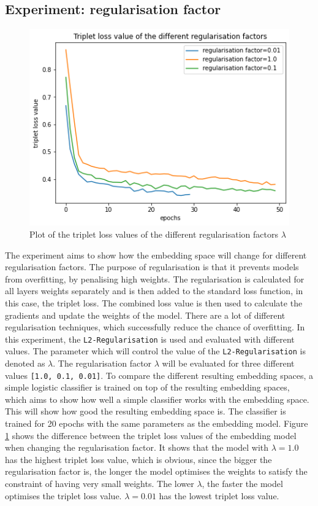 \subsection{Experiment: regularisation factor}
\label{sub:Experiment-Regularisation-Factor}
\begin{figure}[H]
\centering
    \includegraphics[width=0.5\linewidth]{study-doc/experiment_regularisation/assets/triplet_loss.png}
    \caption{Plot of the triplet loss values of the different regularisation factors $\lambda$}
    \label{fig:plot-triplet-loss}
\end{figure}
\noindent
The experiment aims to show how the embedding space will change for different regularisation factors. The purpose of regularisation is that it prevents models from overfitting, by penalising high weights. The regularisation is calculated for all layers weights separately and is then added to the standard loss function, in this case, the triplet loss. The combined loss value is then used to calculate the gradients and update the weights of the model. There are a lot of different regularisation techniques, which successfully reduce the chance of overfitting. In this experiment, the \texttt{L2-Regularisation} is used and evaluated with different values. The parameter which will control the value of the \texttt{L2-Regularisation} is denoted as $\lambda$. The regularisation factor $\lambda$ will be evaluated for three different values \texttt{[1.0, 0.1, 0.01]}.
\newline
\newline
To compare the different resulting embedding spaces, a simple logistic classifier is trained on top of the resulting embedding spaces, which aims to show how well a simple classifier works with the embedding space. This will show how good the resulting embedding space is. The classifier is trained for 20 epochs with the same parameters as the embedding model.
\newline
\newline
Figure \ref{fig:plot-triplet-loss} shows the difference between the triplet loss values of the embedding model when changing the regularisation factor. It shows that the model with $\lambda = 1.0$ has the highest triplet loss value, which is obvious, since the bigger the regularisation factor is, the longer the model optimises the weights to satisfy the constraint of having very small weights. The lower $\lambda$, the faster the model optimises the triplet loss value. $\lambda = 0.01$ has the lowest triplet loss value.
